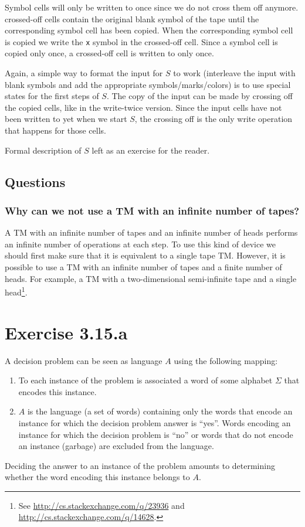 \documentclass{article}
\newcommand{\0}{\texttt{\textvisiblespace}}
\newcommand{\°}{\obullet{\0}}
\newcommand{\X}{\texttt{x}}
\newcommand{\TM}{TM}
\begin{document}
Symbol cells will only be written to once since we do not cross them off anymore.
crossed-off cells contain the original blank symbol of the tape until the
corresponding symbol cell has been copied. When the corresponding symbol cell
is copied we write the \X{} symbol in the crossed-off cell. Since a symbol
cell is copied only once, a crossed-off cell is written to only once.

Again, a simple way to format the input for \(S\) to work
(interleave the input with blank symbols and add the
appropriate symbols/marks/colors) is to use special states for the
first steps of \(S\). The copy of the input can be made by crossing off the copied
cells, like in the write-twice version. Since the input cells have not been
written to yet when we start \(S\), the crossing off is the only write
operation that happens for those cells.

Formal description of $S$ left as an exercise for the reader.

\subsection{Questions}
\subsubsection{Why can we not use a \TM{} with an infinite number of
tapes?}
A \TM{} with an infinite number of tapes and an infinite number of heads
performs an infinite number of operations at each step.
To use this kind of device we should first make sure that it is equivalent to a single
tape \TM{}.
However, it is possible to use a \TM{} with an infinite number of tapes
and a finite number of heads. For example, a \TM{} with a two-dimensional
semi-infinite tape and a single head\footnote{See
\url{http://cs.stackexchange.com/q/23936}
and
\url{http://cs.stackexchange.com/q/14628}.}.

\section{Exercise 3.15.a}
A decision problem can be seen as language \(A\) using the following mapping:
\begin{enumerate}
	\item To each instance of the problem is associated a word of some alphabet
		\(\Sigma\) that encodes this instance.
	\item \(A\) is the language (a set of words) containing only
		the words that encode an instance for
		which the decision problem answer is ``yes''. Words encoding an
		instance for which the decision problem is ``no'' or words that do not
		encode an instance (garbage) are excluded from the language.
\end{enumerate}
Deciding the answer to an instance of the problem amounts to determining
whether the word encoding this instance belongs to \(A\).
\end{document}
